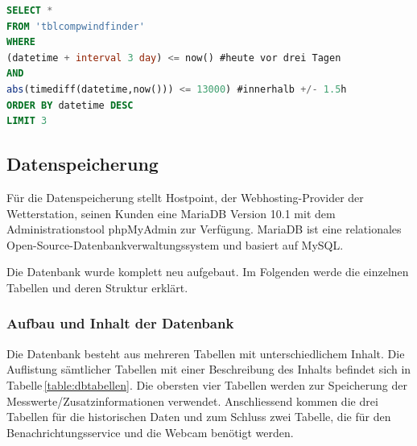\begin{lstlisting}[label=lst:viewForecast,caption=Erzeugung der VIEW für den Forecast-Vergleich, language=SQL, style=htmlcssjs]
SELECT *
FROM 'tblcompwindfinder'
WHERE
(datetime + interval 3 day) <= now() #heute vor drei Tagen
AND
abs(timediff(datetime,now())) <= 13000) #innerhalb +/- 1.5h
ORDER BY datetime DESC
LIMIT 3
\end{lstlisting}



\subsection{Datenspeicherung}
Für die Datenspeicherung stellt Hostpoint, der Webhosting-Provider der Wetterstation, seinen Kunden eine MariaDB Version 10.1 mit dem Administrationstool phpMyAdmin zur Verfügung. MariaDB ist eine relationales Open-Source-Datenbankverwaltungssystem und basiert auf MySQL.

Die Datenbank wurde komplett neu aufgebaut. Im Folgenden werde die einzelnen Tabellen und deren Struktur erklärt.


\subsubsection{Aufbau und Inhalt der Datenbank}
Die Datenbank besteht aus mehreren Tabellen mit unterschiedlichem Inhalt. Die Auflistung sämtlicher Tabellen mit einer Beschreibung des Inhalts befindet sich in Tabelle\,\ref{table:dbtabellen}. Die obersten vier Tabellen werden zur Speicherung der Messwerte/Zusatzinformationen verwendet. Anschliessend kommen die drei Tabellen für die historischen Daten und zum Schluss zwei Tabelle, die für den Benachrichtungsservice und die Webcam benötigt werden.


